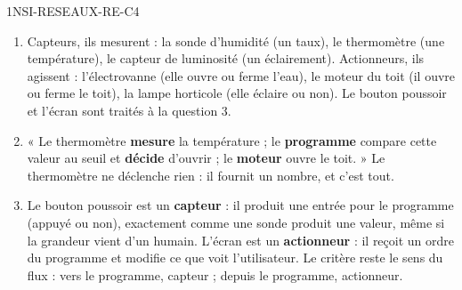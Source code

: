\begin{corrige}{1NSI-RESEAUX-RE-C4}
\begin{enumerate}
  \item Capteurs, ils mesurent : la sonde d'humidité (un taux), le thermomètre (une
        température), le capteur de luminosité (un éclairement). Actionneurs, ils agissent :
        l'électrovanne (elle ouvre ou ferme l'eau), le moteur du toit (il ouvre ou ferme le
        toit), la lampe horticole (elle éclaire ou non). Le bouton poussoir et l'écran sont
        traités à la question 3.
  \item « Le thermomètre \textbf{mesure} la température ; le \textbf{programme} compare cette
        valeur au seuil et \textbf{décide} d'ouvrir ; le \textbf{moteur} ouvre le toit. » Le
        thermomètre ne déclenche rien : il fournit un nombre, et c'est tout.
  \item Le bouton poussoir est un \textbf{capteur} : il produit une entrée pour le programme
        (appuyé ou non), exactement comme une sonde produit une valeur, même si la grandeur
        vient d'un humain. L'écran est un \textbf{actionneur} : il reçoit un ordre du programme
        et modifie ce que voit l'utilisateur. Le critère reste le sens du flux : vers le
        programme, capteur ; depuis le programme, actionneur.
\end{enumerate}
\end{corrige}

